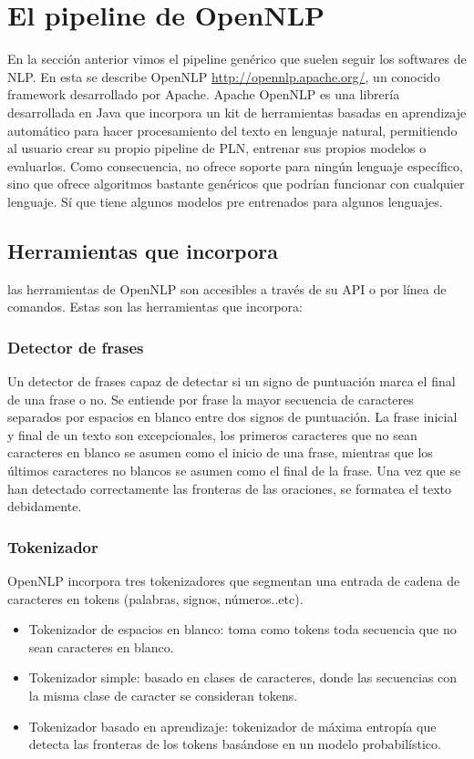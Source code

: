 \section{El pipeline de OpenNLP}
En la sección anterior vimos el pipeline genérico que suelen seguir los softwares de NLP. En esta se describe OpenNLP \url{http://opennlp.apache.org/}, un conocido framework desarrollado por Apache.\newline
Apache OpenNLP es una librería desarrollada en Java que incorpora un kit de herramientas basadas en aprendizaje automático para hacer procesamiento del texto en lenguaje natural, permitiendo al usuario crear su propio pipeline de PLN, entrenar sus propios modelos o evaluarlos. Como consecuencia, no ofrece soporte para ningún lenguaje específico, sino que ofrece algoritmos bastante genéricos que podrían funcionar con cualquier lenguaje. Sí que tiene algunos modelos pre entrenados para algunos lenguajes. 
\subsection{Herramientas que incorpora}
las herramientas de OpenNLP son accesibles a través de su API o por línea de comandos. Estas son las herramientas que incorpora:
\subsubsection{Detector de frases} 
Un detector de frases capaz de detectar si un signo de puntuación marca el final de una frase o no. Se entiende por frase la mayor secuencia de caracteres separados por espacios en blanco entre dos signos de puntuación. La frase inicial y final de un texto son excepcionales, los primeros caracteres que no sean caracteres en blanco se asumen como el inicio de una frase, mientras que los últimos caracteres no blancos se asumen como el final de la frase. Una vez que se han detectado correctamente las fronteras de las oraciones, se formatea el texto debidamente. 
\subsubsection{Tokenizador}
OpenNLP incorpora tres tokenizadores que segmentan una entrada de cadena de caracteres en tokens (palabras, signos, números..etc).
\begin{itemize}
\item Tokenizador de espacios en blanco: toma como tokens toda secuencia que no sean caracteres en blanco.
\item Tokenizador simple: basado en clases de caracteres, donde las secuencias con la misma clase de caracter se consideran tokens. 
\item Tokenizador basado en aprendizaje: tokenizador de máxima entropía que detecta las fronteras de los tokens basándose en un modelo probabilístico.
\end{itemize}
